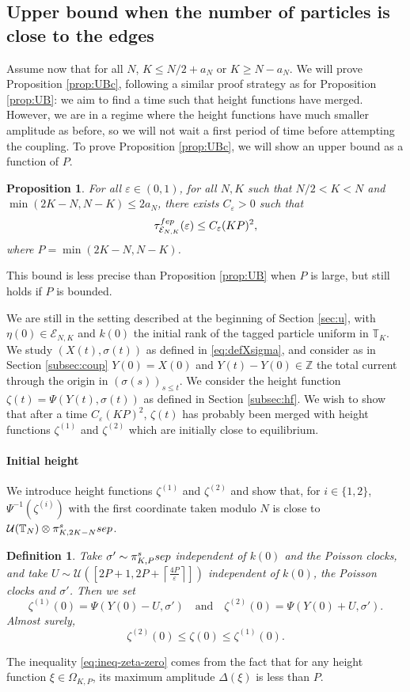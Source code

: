 \documentclass[11pt,a4paper]{article}
\newcommand{\Z}{\mathbb{Z}}
\newcommand{\T}{\mathbb{T}}
\newcommand{\FEP}{\textsc{fep}}
\newcommand{\SSEP}{\textsc{ssep}}
\newtheorem{proposition}[theorem]{Proposition}
\newtheorem{definition}{Definition}[section]
\newcommand{\eqs}[1]{\begin{equation}#1\end{equation}}
\newcommand{\eq}[2]{\begin{equation}\label{#1}#2\end{equation}}
\begin{document}
\subsection{Upper bound when the number of particles is close to the edges}\label{subsec:UBc}
Assume now that for all $N$, $K \le N/2 + a_N$ or $K \ge N-a_N$.
We will prove Proposition \ref{prop:UBc}, following a similar proof strategy as for Proposition \ref{prop:UB}: we aim to find a time such that height functions have merged. However, we are in a regime where the height functions have much smaller amplitude as before, so we will not wait a first period of time before attempting the coupling. 
To prove Proposition \ref{prop:UBc}, we will show an upper bound as a function of $P$. \begin{proposition} \label{prop:UBc2}
For all $\varepsilon \in (0,1)$, for all $N,K$ such that $N/2 < K < N$ and $\min(2K-N,N-K)\le 2a_N$, there exists $C_\varepsilon > 0$ such that
\eq{eq:propUBc2}{\tau^{\FEP}_{\mathcal{E}_{N,K}}(\varepsilon) \le  C_\varepsilon (KP)^2,}
where $P=\min(2K-N,N-K)$.
\end{proposition} 
This bound is less precise than Proposition \ref{prop:UB} when $P$ is large, but still holds if $P$ is bounded. 

We are still in the setting described at the beginning of Section \ref{sec:u}, 
with $\eta(0) \in \mathcal{E}_{N,K}$ and $k(0)$ the initial rank of the tagged particle uniform in $\T_K$. We study $(X(t),\sigma(t))$ as defined in \eqref{eq:defXsigma}, and consider as in Section \ref{subsec:coup} $Y(0)=X(0)$ and $Y(t)-Y(0)\in\Z$ the total current through the origin in $\left(\sigma(s)\right)_{s\le t}$. We consider the height function $\zeta(t) = \Psi\left(Y(t),\sigma(t)\right)$ as defined in Section \ref{subsec:hf}. We wish to show that after a time $C_\varepsilon (KP)^2$, $\zeta(t)$ has probably been merged with height functions $\zeta^{(1)}$ and $\zeta^{(2)}$ which are initially close to equilibrium.

\paragraph{Initial height} We introduce height functions $\zeta^{(1)}$ and $\zeta^{(2)}$ and show that, for $i\in\{1,2\}$, $\Psi^{-1}(\zeta^{(i)})$ with the first coordinate taken modulo $N$ is close to $\mathcal{U}(\T_N) \otimes \pi_{K,2K-N}^\SSEP$.
\begin{definition}
Take $\sigma' \sim \pi_{K,P}^\SSEP$ independent of $k(0)$ and the Poisson clocks, and take $U \sim \mathcal{U}\left(\left[2P+1, 2P + \left\lceil \frac{4P}{\varepsilon}\right\rceil\right]\right)$ independent of $k(0)$, the Poisson clocks and $\sigma'$. Then we set
\eqs{\zeta^{(1)}(0) = \Psi(Y(0) - U, \sigma') \quad \text{and} \quad \zeta^{(2)}(0) = \Psi(Y(0) + U, \sigma').}
Almost surely,
\eq{eq:ineq-zeta-zero}{\zeta^{(2)}(0) \le \zeta(0) \le \zeta^{(1)}(0).}
\end{definition}
The inequality \eqref{eq:ineq-zeta-zero} comes from the fact that for any height function $\xi \in \Omega_{K,P}$, its maximum amplitude $\Delta(\xi)$ is less than $P$. 
\end{document}

